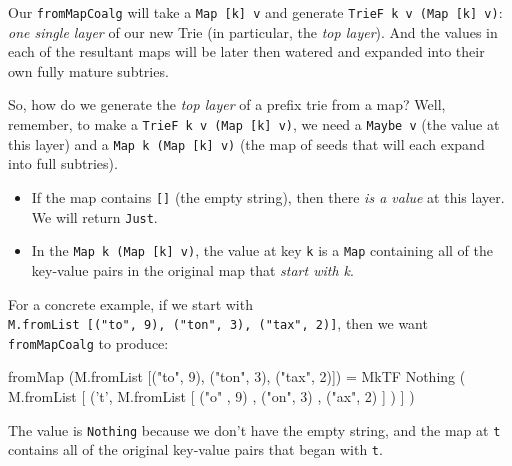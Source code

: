 \documentclass[]{article}
\newenvironment{Shaded}{}{}
\newcommand{\CharTok}[1]{\textcolor[rgb]{0.25,0.44,0.63}{#1}}
\newcommand{\DataTypeTok}[1]{\textcolor[rgb]{0.56,0.13,0.00}{#1}}
\newcommand{\DecValTok}[1]{\textcolor[rgb]{0.25,0.63,0.44}{#1}}
\newcommand{\FunctionTok}[1]{\textcolor[rgb]{0.02,0.16,0.49}{#1}}
\newcommand{\NormalTok}[1]{#1}
\newcommand{\StringTok}[1]{\textcolor[rgb]{0.25,0.44,0.63}{#1}}
\begin{document}
Our \texttt{fromMapCoalg} will take a \texttt{Map\ {[}k{]}\ v} and generate
\texttt{TrieF\ k\ v\ (Map\ {[}k{]}\ v)}: \emph{one single layer} of our new Trie
(in particular, the \emph{top layer}). And the values in each of the resultant
maps will be later then watered and expanded into their own fully mature
subtries.

So, how do we generate the \emph{top layer} of a prefix trie from a map? Well,
remember, to make a \texttt{TrieF\ k\ v\ (Map\ {[}k{]}\ v)}, we need a
\texttt{Maybe\ v} (the value at this layer) and a
\texttt{Map\ k\ (Map\ {[}k{]}\ v)} (the map of seeds that will each expand into
full subtries).

\begin{itemize}
\tightlist
\item
  If the map contains \texttt{{[}{]}} (the empty string), then there \emph{is a
  value} at this layer. We will return \texttt{Just}.
\item
  In the \texttt{Map\ k\ (Map\ {[}k{]}\ v)}, the value at key \texttt{k} is a
  \texttt{Map} containing all of the key-value pairs in the original map that
  \emph{start with k}.
\end{itemize}

For a concrete example, if we start with
\texttt{M.fromList\ {[}("to",\ 9),\ ("ton",\ 3),\ ("tax",\ 2){]}}, then we want
\texttt{fromMapCoalg} to produce:

\begin{Shaded}
\begin{Highlighting}[]
\NormalTok{fromMap (M.fromList [(}\StringTok{"to"}\NormalTok{, }\DecValTok{9}\NormalTok{), (}\StringTok{"ton"}\NormalTok{, }\DecValTok{3}\NormalTok{), (}\StringTok{"tax"}\NormalTok{, }\DecValTok{2}\NormalTok{)])}
    \FunctionTok{=} \DataTypeTok{MkTF} \DataTypeTok{Nothing}\NormalTok{ (}
\NormalTok{          M.fromList [}
\NormalTok{            (}\CharTok{'t'}\NormalTok{, M.fromList [}
\NormalTok{                (}\StringTok{"o"}\NormalTok{ , }\DecValTok{9}\NormalTok{)}
\NormalTok{              , (}\StringTok{"on"}\NormalTok{, }\DecValTok{3}\NormalTok{)}
\NormalTok{              , (}\StringTok{"ax"}\NormalTok{, }\DecValTok{2}\NormalTok{)}
\NormalTok{              ]}
\NormalTok{            )}
\NormalTok{          ]}
\NormalTok{        )}
\end{Highlighting}
\end{Shaded}

The value is \texttt{Nothing} because we don't have the empty string, and the
map at \texttt{t} contains all of the original key-value pairs that began with
\texttt{t}.
\end{document}
